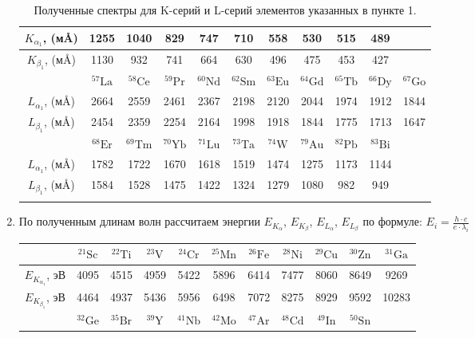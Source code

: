 \documentclass[a4paper, 12pt]{article}%
\begin{document}
\begin{enumerate}
\begin{longtable}{|c|c|c|c|c|c|c|c|c|c|c|}
		 	$K_{\alpha_1}$, (м\AA) & 1255 & 1040 & 829 & 747 & 710 & 558 & 530 & 515 & 489 & \\ \hline
		 	$K_{\beta_1}$, (м\AA) & 1130 & 932 & 741 & 664 & 630 & 496 & 475 & 453 & 427 & \\ 
		 	\hline
		 	\hline
		 	
		 	&${ }^{57} \mathrm{La}$&${ }^{58} \mathrm{Ce}$&${ }^{59} \mathrm{Pr}$&${ }^{60} \mathrm{Nd}$&${ }^{62} \mathrm{Sm}$&${ }^{63} \mathrm{Eu}$&${ }^{64} \mathrm{Gd}$&$ { }^{65} \mathrm{Tb}$&${ }^{66} \mathrm{Dy}$&${ }^{67} \mathrm{Go} $\\ \hline
		 	
	 		$L_{\alpha_1}$, (м\AA) & 2664 & 2559 & 2461 & 2367 & 2198 & 2120 & 2044 & 1974 & 1912 & 1844 \\ \hline
		 	$L_{\beta_1}$, (м\AA) & 2454 & 2359 & 2254 & 2164 & 1998 & 1918 & 1844 & 1775 & 1713 & 1647 \\ 
		 	\hline
		 	\hline
		 	
		 	& ${ }^{68} \mathrm{Er}$ & ${ }^{69} \mathrm{Tm}$ & ${ }^{70} \mathrm{Yb}$ & ${ }^{71} \mathrm{Lu}$ & ${}^{73} \mathrm{Ta}$ & ${ }^{74} \mathrm{W}$ & ${ }^{79} \mathrm{Au}$ & ${ }^{82} \mathrm{Pb}$ &${ }^{83} \mathrm{Bi}$ & \\ \hline
		 	
		 	$L_{\alpha_1}$, (м\AA)& 1782 & 1722 & 1670 & 1618 & 1519 & 1474 & 1275 & 1173 & 1144 &  \\ \hline
		 	$L_{\beta_1}$, (м\AA) & 1584 & 1528 & 1475 & 1422 & 1324 & 1279 & 1080 & 982 & 949 &   \\ \hline
		 	
		 	\caption{Полученные спектры для K-серий и L-серий элементов указанных в пункте 1.}
	 	
		 \end{longtable}
		 
		 
		\item По полученным длинам волн рассчитаем энергии $E_{K_\alpha}$, $E_{K_\beta}$, $E_{L_\alpha}$, $E_{L_\beta}$ по формуле: $E_i = \frac{h \cdot c}{e\cdot\lambda_i} $
		
		
		\begin{longtable}{|c|c|c|c|c|c|c|c|c|c|c|}
			\hline
			& ${ }^{21} \mathrm{Sc}$ & ${ }^{22} \mathrm{Ti}$ & ${}^{23} \mathrm{V}$ & ${ }^{24} \mathrm{Cr}$ & ${ }^{25} \mathrm{Mn}$ & ${ }^{26} \mathrm{Fe}$ & ${ }^{28} \mathrm{Ni}$ & ${ }^{29} \mathrm{Cu}$ & ${ }^{30} \mathrm{Zn}$ & ${ }^{31} \mathrm{Ga}$ \\ \hline
			
			$E_{K_{\alpha_1}}$, эВ & 4095 & 4515 & 4959 & 5422 & 5896 & 6414 & 7477 & 8060 & 8649 & 9269 \\ \hline
			$E_{K_{\beta_1}}$, эВ & 4464 &  4937 &  5436 &  5956 &  6498 &  7072 &  8275 &  8929 &  9592 &  10283
			 \\ \hline
			\hline
			& ${ }^{32} \mathrm{Ge}$ & ${}^{35} \mathrm{Br}$ & ${ }^{39} \mathrm{Y}$ & ${ }^{41} \mathrm{Nb}$ & ${ }^{42} \mathrm{Mo}$ & ${ }^{47} \mathrm{Ar}$ & ${ }^{48} \mathrm{Cd}$ & ${ }^{49} \mathrm{In}$ & ${ }^{50} \mathrm{Sn}$ & \\ \hline
			

\end{longtable}
\end{enumerate}
\end{document}
